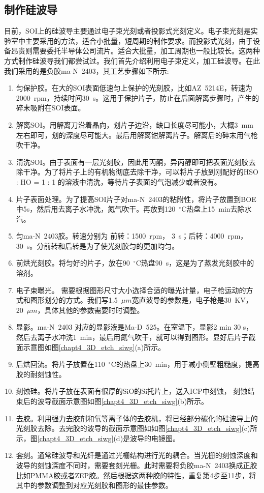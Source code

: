 \subsection{制作硅波导}\label{fab_siwg}
目前，SOI上的硅波导主要通过电子束光刻或者投影式光刻定义。电子束光刻是实验室中主要采用的方法，适合小批量，短周期的制作要求。而投影式光刻，由于设备昂贵则需要委托半导体公司流片。适合大批量，加工周期也一般比较长。这两种方式制作硅波导我们都尝试过。我们首先介绍利用电子束定义，加工硅波导。在此我们采用的是负胶ma-N~2403，其工艺步骤如下所示:
\begin{enumerate}[(1)]
	\item 匀保护胶。在大的SOI表面低速匀上保护的光刻胶，比如AZ~5214E，转速为2000~rpm，持续时间30~s。这用于保护片子，防止在后面解离步骤时，产生的碎末吸附在SOI表面。
	\item 解离SOI。用解离刀沿着晶向，划片子边沿，缺口长度尽可能小，大概3~mm左右即可，划的深度尽可能大。最后用解离钳解离片子。解离后的碎末用气枪吹干净。
	\item 清洗SOI。由于表面有一层光刻胶，因此用丙酮，异丙醇即可把表面光刻胶去除干净。为了将片子上的有机物彻底去除干净，可以将片子放到刚配好的HSO : HO = 1 : 1 的溶液中清洗，等待片子表面的气泡减少或者没有。
	\item 片子表面处理。为了提高SOI片子对ma-N~2403的粘附性，将片子放置到BOE中5s，然后用去离子水冲洗，氮气吹干。再放到120~$^{\circ}$C热盘上15~min去除水汽。
	\item 匀ma-N~2403胶。转速分别为 前转：1500~rpm， 3~s；后转：4000~rpm，30~s。分前转和后转是为了使光刻胶匀的更加均匀。
	\item 前烘光刻胶。将匀好的片子，放在90~$^{\circ}$C热盘90~s，这是为了蒸发光刻胶中的溶剂。
	\item 电子束曝光。 需要根据图形尺寸大小选择合适的曝光计量，电子枪运动的方式和图形划分的方式。我们写1.5~$\mu m$宽直波导的参数是，电子枪是30~KV， 20~$\mu m$，具体其他的参数需要时时调整。
	\item 显影。ma-N~2403 对应的显影液是Ma-D~525。在室温下，显影2 min 30 s，然后去离子水冲洗1~min，最后用氮气吹干，就可以得到图形。显好后片子截面示意图如图\ref{chapt4_3D_etch_siwg}(a)所示。
	\item 后烘回流。将片子放置在110~$^{\circ}$C的热盘上30~min，用于减小侧壁粗糙度，提高胶的耐刻蚀性。
	\item 刻蚀硅。将片子放在表面有很厚的SiO的Si托片上，送入ICP中刻蚀， 刻蚀结束后的波导截面示意图如图\ref{chapt4_3D_etch_siwg}(b)所示。
	\item 去胶。利用强力去胶剂和氧等离子体的去胶机，将已经部分碳化的硅波导上的光刻胶去除。去完胶的波导的截面示意图如如图\ref{chapt4_3D_etch_siwg}(c)所示，图\ref{chapt4_3D_etch_siwg}(d)是波导的电镜图。
	\item 套刻。通常硅波导和光纤是通过光栅结构进行光的耦合。当光栅的刻蚀深度和波导的刻蚀深度不同时，需要套刻光栅。此时需要将负胶ma-N~2403换成正胶比如PMMA胶或者ZEP胶。然后根据这两种胶的特性，重复第4步至11步，将其中的参数调整到对应光刻胶和图形的最佳参数。
\end{enumerate}

